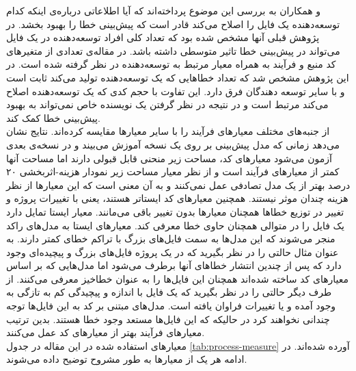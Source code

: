  و همکاران به بررسی این موضوع پرداخته‌اند که آیا اطلاعاتی درباره‌ی اینکه کدام توسعه‌دهنده یک فایل را اصلاح می‌کند قادر است که پیش‌بینی خطا را بهبود بخشد. در پژوهش قبلی آنها\cite{weyuker2008too} مشخص شده بود که تعداد کلی   افراد توسعه‌دهنده در یک فایل می‌تواند در پیش‌بینی خطا تاثیر متوسطی داشته باشد. در  مقاله‌ی \cite{ostrand2010programmer}  تعدادی از متغیرهای کد منبع و فرآیند به همراه معیار مرتبط به توسعه‌دهنده در نظر گرفته شده است.  در این پژوهش مشخص شد  که تعداد خطاهایی که یک توسعه‌دهنده تولید می‌کند ثابت است و با سایر توسعه دهندگان فرق دارد. این تفاوت با  حجم کدی که یک توسعه‌دهنده اصلاح می‌کند مرتبط است و در نتیجه در نظر گرفتن یک نویسنده خاص نمی‌تواند به بهبود پیش‌بینی خطا کمک کند\cite{ostrand2010programmer}. \\

 از جنبه‌های مختلف معیارهای فرآیند  را با سایر معیارها مقایسه کرده‌اند\cite{rahman2013and}. نتایج نشان می‌دهد  زمانی که مدل پیش‌بینی بر روی یک نسخه آموزش می‌بیند و در نسخه‌ی بعدی آزمون می‌شود معیارهای کد، مساحت زیر منحنی  قابل قبولی دارند اما مساحت آنها کمتر از معیارهای فرآیند است  و از نظر معیار مساحت زیر نمودار هزینه-اثربخشی ۲۰ درصد 
بهتر از یک مدل تصادفی عمل نمی‌کنند و  به آن معنی است که این معیارها از نظر هزینه چندان  موثر نیستند. همچنین معیارهای کد ایستاتر هستند، ‌یعنی با تغییرات پروژه و تغییر در توزیع خطاها همچنان معیارها بدون تغییر باقی می‌مانند. معیار ایستا تمایل دارد یک فایل را در  متوالی همچنان حاوی خطا معرفی کند. معیارهای ایستا به مدل‌های راکد منجر می‌شوند که این مدل‌ها به سمت فایل‌های بزرگ با تراکم خطای کمتر  دارند. به عنوان مثال حالتی را در نظر بگیرید که در یک پروژه فایل‌های بزرگ و پیچیده‌ای وجود دارد که پس از چندین انتشار خطاهای آنها برطرف می‌شود اما مدل‌هایی که بر اساس معیارهای کد ساخته شده‌اند همچنان این فایل‌ها را به عنوان خطا‌خیز معرفی می‌کنند. از طرف دیگر حالتی را در نظر بگیرید که یک فایل با اندازه و پیچیدگی کم به تازگی به وجود آمده و یا تغییرات فراوان یافته است. مدل‌های مبتنی بر کد به این فایل‌ها توجه چندانی نخواهند کرد در حالیکه که این فایل‌ها مستعد وجود خطا هستند. بدین ترتیب معیارهای فرآیند بهتر از معیارهای کد عمل می‌کنند. \\
معیارهای استفاده شده در این مقاله در جدول \ref{tab:process-measure} آورده شده‌اند. در ادامه هر یک از معیارها به طور مشروح توضیح داده می‌شوند. 
 
